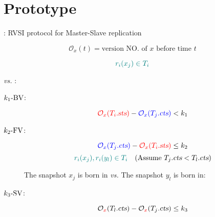 \section{\chameleon{} Prototype}



\begin{frame}{}
  \centerline{\rvsims{}: RVSI protocol for Master-Slave replication}

  \vspace{-0.80cm}
  \begin{center}
    \resizebox{0.50\textwidth}{!}{}
  \end{center}
\end{frame}

\begin{frame}{}
  \[
    \mathcal{O}_{x}(t) = \text{version NO. of } x \text{ before time } t %
  \]


  \[
    \textcolor{teal}{r_i(x_j) \in T_i}
  \]
  \begin{center}
     \emph{vs.} :
  \end{center}

  \vspace{-0.40cm}
  \begin{description}
    \item[$k_1\text{-BV}$:]
      \[
	\textcolor{red}{\mathcal{O}_{x}(T_i.\textsl{sts})} - \textcolor{blue}{\mathcal{O}_{x}(T_j.\textsl{cts})} < k_1
      \]
    \item[$k_2\text{-FV}$:]
      \[
	\textcolor{blue}{\mathcal{O}_{x}(T_j.\textsl{cts})} - \textcolor{red}{\mathcal{O}_{x}(T_i.\textsl{sts})} \le k_2
      \]
    \pause
      \[
	\textcolor{teal}{r_i(x_j), r_i(y_l) \in T_i} \quad (\text{Assume } T_j.\textsl{cts} < T_l.\textsl{cts})
      \]
      \centerline{The snapshot $x_j$ is born in \emph{vs.} The snapshot $y_l$ is born in:}
    \item[$k_3\text{-SV}$:]
      \vspace{-0.40cm}
      \[
	\mathcal{O}_{\textcolor{red}{x}}(T_l.\textsl{cts}) - \mathcal{O}_{\textcolor{red}{x}}(T_j.\textsl{cts}) \le k_3
      \]
  \end{description}
\end{frame}


